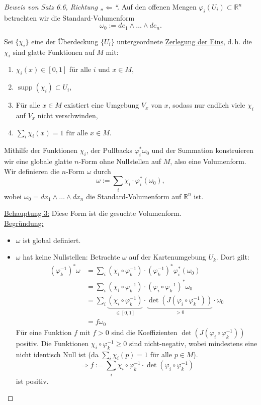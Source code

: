 \documentclass[fleqn, 12pt, letterpaper]{article}
\begin{document}
\begin{proof}[Beweis von Satz 6.6, Richtung „\(\Leftarrow\)“]
Auf den offenen Mengen \( \varphi_i(U_i) \subset \mathbb{R}^n \) betrachten wir die Standard-Volumenform
\[
\omega_0 := de_1 \wedge \dots \wedge de_n.
\]

Sei \( \{\chi_i\} \) eine der Überdeckung \( \{U_i\} \) untergeordnete \underline{Zerlegung der Eins},  
d.\,h. die \( \chi_i \) sind glatte Funktionen auf \( M \) mit:

\begin{enumerate}[label=\roman*)]
    \item \( \chi_i(x) \in [0,1] \) für alle \( i \) und \( x \in M \),
    \item \( \operatorname{supp}(\chi_i) \subset U_i \),
    \item Für alle \( x \in M \) existiert eine Umgebung \( V_x \) von \( x \), sodass nur endlich viele \( \chi_i \) auf \( V_x \) nicht verschwinden,
    \item \( \sum_i \chi_i(x) = 1 \) für alle \( x \in M \).
\end{enumerate}

Mithilfe der Funktionen \( \chi_i \), der Pullbacks \( \varphi_i^*\omega_0 \) und der Summation konstruieren wir eine globale glatte \( n \)-Form ohne Nullstellen auf \( M \), also eine Volumenform.\\

Wir definieren die \( n \)-Form \( \omega \) durch
\[
\omega := \sum_i \chi_i \cdot \varphi_i^*(\omega_0),
\]
wobei \( \omega_0 = dx_1 \wedge \dots \wedge dx_n \) die Standard-Volumenform auf \( \mathbb{R}^n \) ist.

\underline{Behauptung 3:} Diese Form ist die gesuchte Volumenform.\\

\underline{Begründung:}
\begin{itemize}
    \item \( \omega \) ist global definiert.
    \item \( \omega \) hat keine Nullstellen: Betrachte \( \omega \) auf der Kartenumgebung \( U_k \). Dort gilt:
    \begin{align*}
        (\varphi_k^{-1})^* \omega
        &= \sum_i (\chi_i \circ \varphi_k^{-1}) \cdot (\varphi_k^{-1})^* \varphi_i^*(\omega_0) \\
        &= \sum_i (\chi_i \circ \varphi_k^{-1}) \cdot (\varphi_i \circ \varphi_k^{-1})^* \omega_0 \\
        &= \sum_i \underbrace{(\chi_i \circ \varphi_k^{-1})}_{\in [0,1]} \cdot \underbrace{\det(J(\varphi_i \circ \varphi_k^{-1}))}_{>0} \cdot \omega_0 \\
        &= f\omega_0
    \end{align*}
    Für eine Funktion \( f \) mit \( f > 0 \) sind die Koeffizienten \(\det(J(\varphi_i \circ \varphi_k^{-1}))\) positiv.  
    Die Funktionen \( \chi_i \circ \varphi_k^{-1} \geq 0 \) sind nicht-negativ, wobei mindestens eine nicht identisch Null ist (da \( \sum_i \chi_i(p) = 1 \) für alle \( p \in M \)).
    \[
    \Rightarrow f:= \sum_i \chi_i \circ \varphi_k^{-1} \cdot \det(\varphi_i \circ \varphi_k^{-1})
    \]
    ist positiv.
\end{itemize}


\end{proof}
\end{document}
